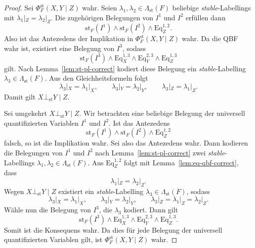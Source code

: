 \begin{proof}
    \label{pr:st-ind-qbf-correct}
    Sei \(\Phi^{\mathrm{st}}_F(X,Y\mid Z)\) wahr. Seien
    \(\lambda_1,\lambda_2\in\Lambda_{\mathrm{st}}(F)\) beliebige
    \textit{stable}-Labellings mit \(\lambda_1|_Z=\lambda_2|_Z\).
    Die zugehörigen Belegungen von
    \(I^1\) und
    \(I^2\) erfüllen dann
    \[
        \mathrm{st}_F(I^1)
        \land
        \mathrm{st}_F(I^2)
        \land
        \mathrm{Eq}^{1,2}_Z.
    \]
    Also ist das Antezedens der Implikation in
    \(\Phi^{\mathrm{st}}_F(X,Y\mid Z)\) wahr. Da die QBF wahr ist,
    existiert eine Belegung von
    \(I^3\), sodass
    \[
        \mathrm{st}_F(I^3)
        \land
        \mathrm{Eq}^{1,3}_X
        \land
        \mathrm{Eq}^{2,3}_Y
        \land
        \mathrm{Eq}^{1,3}_Z
    \]
    gilt. Nach Lemma~\ref{lem:st-pl-correct} kodiert diese Belegung ein
    \textit{stable}-Labelling
    \(\lambda_3\in\Lambda_{\mathrm{st}}(F)\). Aus den
    Gleichheitsformeln folgt
    \[
        \lambda_3|_X=\lambda_1|_X,\qquad
        \lambda_3|_Y=\lambda_2|_Y,\qquad
        \lambda_3|_Z=\lambda_1|_Z.
    \]
    Damit gilt \(X\bot_{\mathrm{st}}Y\mid Z\).

    Sei umgekehrt \(X\bot_{\mathrm{st}}Y\mid Z.\) Wir betrachten eine beliebige Belegung der universell quantifizierten Variablen
    \(I^1\) und \(I^2\). Ist das Antezedens
    \[
        \mathrm{st}_F(I^1)
        \land
        \mathrm{st}_F(I^2)
        \land
        \mathrm{Eq}^{1,2}_Z
    \]
    falsch, so ist die Implikation wahr.
    Sei also das Antezedens wahr. Dann kodieren die Belegungen von
    \(I^1\) und \(I^2\) nach Lemma~\ref{lem:st-pl-correct} zwei
    \textit{stable}-Labellings \(\lambda_1,\lambda_2\in\Lambda_{\mathrm{st}}(F)\).
    Aus \(\mathrm{Eq}^{1,2}_Z\) folgt mit Lemma~\ref{lem:eq-qbf-correct}, dass
    \[
        \lambda_1|_Z=\lambda_2|_Z.
    \]
    Wegen \(X\bot_{\mathrm{st}}Y\mid Z\) existiert ein
    \textit{stable}-Labelling
    \(\lambda_3\in\Lambda_{\mathrm{st}}(F)\), sodass
    \[
        \lambda_3|_X=\lambda_1|_X,\qquad
        \lambda_3|_Y=\lambda_2|_Y,\qquad
        \lambda_3|_Z=\lambda_1|_Z=\lambda_2|_Z.
    \]
    Wähle nun die Belegung von \(I^3\), die \(\lambda_3\) kodiert.
    Dann gilt
    \[
        \mathrm{st}_F(I^3)
        \land
        \mathrm{Eq}^{1,3}_X
        \land
        \mathrm{Eq}^{2,3}_Y
        \land
        \mathrm{Eq}^{1,3}_Z.
    \]
    Somit ist die Konsequens wahr. Da dies für jede Belegung der
    universell quantifizierten Variablen gilt, ist
    \(\Phi^{\mathrm{st}}_F(X,Y\mid Z)\) wahr.
\end{proof}